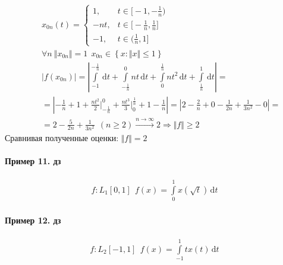 \documentclass{article}[12pt]
\renewcommand{\d}{\,\mathrm{d}}
\begin{document}
\begin{eqnarray*}
    &&x_{0n}(t)=\left\{\begin{array}{ll}
            1,&t\in\Big[-1,-\frac{1}{n}\Big)\\
            -nt,&t\in\Big[-\frac{1}{n},\frac{1}{n}\Big]\\
            -1,&t\in\Big(\frac{1}{n},1\Big]
    \end{array} \right.\\
    &&\forall n\ \Vert x_{0n} \Vert =1
    \ \ x_{0n}\in\left\{x:\Vert x \Vert \leqslant 1\right\}\\
    &&|f(x_{0n})|
    =\left|\int\limits_{-1}^{-\frac{1}{n}}\d{t}
    +\int\limits_{-\frac{1}{n}}^{0}nt\d{t}
    +\int\limits_{0}^{\frac{1}{n}}nt^{2}\d{t}
    +\int\limits_{\frac{1}{n}}^{1}\d{t}\right|=\\
    &&=\left|-\frac{1}{n}+1
    +\frac{nt^{2}}{2}\Big|_{-\frac{1}{n}}^{0}
    +\frac{nt^{3}}{3}\Big|^{\frac{1}{n}}_{0}
    +1-\frac{1}{n}\right|
    =\left|2-\frac{2}{n}+0-\frac{1}{2n}+\frac{1}{3n^{2}}-0\right|=\\
    &&=2-\frac{5}{2n}+\frac{1}{3n^{2}}\ \ (n\geqslant 2)
    \stackrel{n\to\infty}{\to}2 \Rightarrow \Vert f \Vert \geqslant 2
\end{eqnarray*}
Сравнивая полученные оценки: $\Vert f \Vert =2$

\paragraph{Пример 11. дз}
\begin{eqnarray*}
    f:L_{1}[0,1]
    \ \ f(x)=\int\limits_{0}^{1}x(\sqrt{t})\d{t}
\end{eqnarray*}

\paragraph{Пример 12. дз}
\begin{eqnarray*}
    f:L_{2}[-1,1]
    \ \ f(x)=\int\limits_{-1}^{1}tx(t)\d{t}
\end{eqnarray*}
\end{document}
